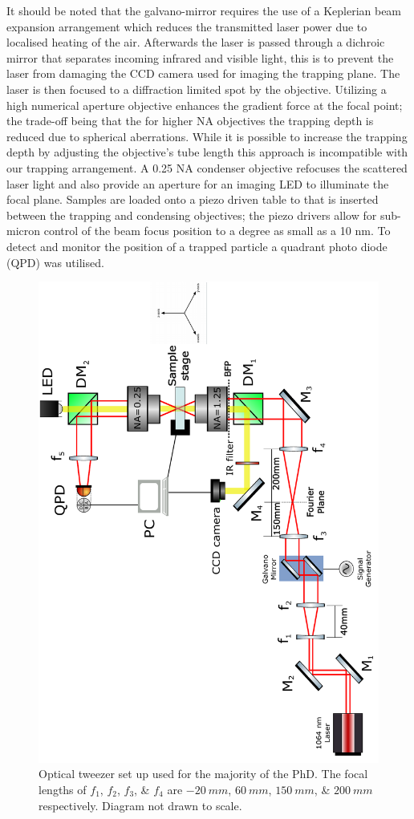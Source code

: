 It should be noted that the galvano-mirror requires the use of a 
Keplerian beam expansion arrangement which reduces the transmitted 
laser power due to localised heating of the air. Afterwards the 
laser is passed through a dichroic mirror that separates incoming 
infrared and visible light, this is to prevent the laser from 
damaging the CCD camera used for imaging the trapping plane. The 
laser is then focused to a diffraction limited spot by the objective. 
Utilizing a high numerical aperture objective enhances the gradient 
force at the focal point; the trade-off being that the for higher NA 
objectives the trapping depth is reduced due to spherical aberrations. 
While it is possible to increase the trapping depth \cite{Reihani2006} 
by adjusting the objective's tube length this approach is incompatible 
with our trapping arrangement. A 0.25 NA condenser objective refocuses 
the scattered laser light and also provide an aperture for an imaging 
LED to illuminate the focal plane. Samples are loaded onto a piezo 
driven table to that is inserted between the trapping and condensing 
objectives; the piezo drivers allow for sub-micron control of the 
beam focus position to a degree as small as a 10 nm. To detect and 
monitor the position of a trapped particle a quadrant photo diode 
(QPD) was utilised. 
\begin{figure}[h!]
	\centering
	\includegraphics[height=\linewidth, angle=270]{tweezer_setup.pdf}
	\caption{Optical tweezer set up used for the majority of the PhD. The focal lengths of $f_1$, $f_2$, $f_3$, \& $f_4$ are $-20\ mm$, $60\ mm$, $150\ mm$, \& $200\ mm$ respectively. Diagram not drawn to scale.}
	\label{fig:setup}
\end{figure}


